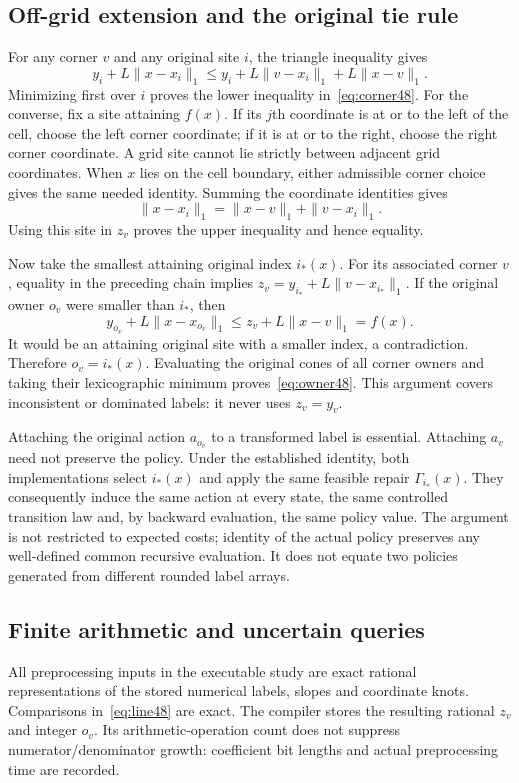 \subsection{Off-grid extension and the original tie rule}
For any corner $v$ and any original site $i$, the triangle inequality gives
\[
 y_i+L\|x-x_i\|_1\le y_i+L\|v-x_i\|_1+L\|x-v\|_1.
\]
Minimizing first over $i$ proves the lower inequality in~\eqref{eq:corner48}. For the converse, fix a site attaining $f(x)$. If its $j$th coordinate is at or to the left of the cell, choose the left corner coordinate; if it is at or to the right, choose the right corner coordinate. A grid site cannot lie strictly between adjacent grid coordinates. When $x$ lies on the cell boundary, either admissible corner choice gives the same needed identity. Summing the coordinate identities gives
\[
 \|x-x_i\|_1=\|x-v\|_1+\|v-x_i\|_1.
\]
Using this site in $z_v$ proves the upper inequality and hence equality.

Now take the smallest attaining original index $i_*(x)$. For its associated corner $v$, equality in the preceding chain implies
$z_v=y_{i_*}+L\|v-x_{i_*}\|_1$.
If the original owner $o_v$ were smaller than $i_*$, then
\[
 y_{o_v}+L\|x-x_{o_v}\|_1
 \le z_v+L\|x-v\|_1=f(x).
\]
It would be an attaining original site with a smaller index, a contradiction. Therefore $o_v=i_*(x)$. Evaluating the original cones of all corner owners and taking their lexicographic minimum proves~\eqref{eq:owner48}. This argument covers inconsistent or dominated labels: it never uses $z_v=y_v$.

Attaching the original action $a_{o_v}$ to a transformed label is essential. Attaching $a_v$ need not preserve the policy. Under the established identity, both implementations select $i_*(x)$ and apply the same feasible repair $\Gamma_{i_*}(x)$. They consequently induce the same action at every state, the same controlled transition law and, by backward evaluation, the same policy value. The argument is not restricted to expected costs; identity of the actual policy preserves any well-defined common recursive evaluation. It does not equate two policies generated from different rounded label arrays.

\subsection{Finite arithmetic and uncertain queries}
All preprocessing inputs in the executable study are exact rational representations of the stored numerical labels, slopes and coordinate knots. Comparisons in~\eqref{eq:line48} are exact. The compiler stores the resulting rational $z_v$ and integer $o_v$. Its arithmetic-operation count does not suppress numerator/denominator growth: coefficient bit lengths and actual preprocessing time are recorded.

